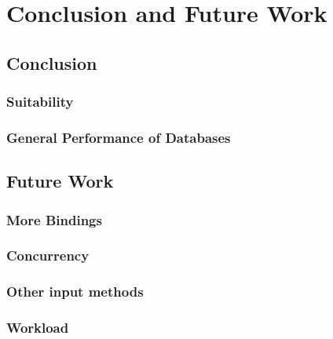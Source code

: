 \chapter{Conclusion and Future Work}
\label{ch:FutureWork}

\section{Conclusion}

\subsection{Suitability}

\subsection{General Performance of Databases}

\section{Future Work}

\subsection{More Bindings}

\subsection{Concurrency}

\subsection{Other input methods }

\subsection{Workload }

